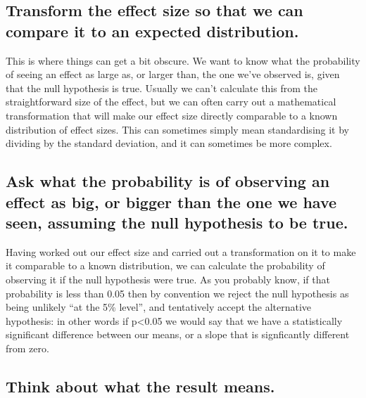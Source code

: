 \documentclass[
]{book}
\begin{document}
\hypertarget{transform-the-effect-size-so-that-we-can-compare-it-to-an-expected-distribution.}{%
\subsection{Transform the effect size so that we can compare it to an expected distribution.}\label{transform-the-effect-size-so-that-we-can-compare-it-to-an-expected-distribution.}}

This is where things can get a bit obscure. We want to know what the probability of seeing an effect as large as, or larger than, the one we've observed is, given that the null hypothesis is true. Usually we can't calculate this from the straightforward size of the effect, but we can often carry out a mathematical transformation that will make our effect size directly comparable to a known distribution of effect sizes. This can sometimes simply mean standardising it by dividing by the standard deviation, and it can sometimes be more complex.

\hypertarget{ask-what-the-probability-is-of-observing-an-effect-as-big-or-bigger-than-the-one-we-have-seen-assuming-the-null-hypothesis-to-be-true.}{%
\subsection{Ask what the probability is of observing an effect as big, or bigger than the one we have seen, assuming the null hypothesis to be true.}\label{ask-what-the-probability-is-of-observing-an-effect-as-big-or-bigger-than-the-one-we-have-seen-assuming-the-null-hypothesis-to-be-true.}}

Having worked out our effect size and carried out a transformation on it to make it comparable to a known distribution, we can calculate the probability of observing it if the null hypothesis were true. As you probably know, if that probability is less than 0.05 then by convention we reject the null hypothesis as being unlikely ``at the 5\% level'', and tentatively accept the alternative hypothesis: in other words if p\textless0.05 we would say that we have a statistically significant difference between our means, or a slope that is signficantly different from zero.

\hypertarget{think-about-what-the-result-means.}{%
\subsection{Think about what the result means.}\label{think-about-what-the-result-means.}}
\end{document}
